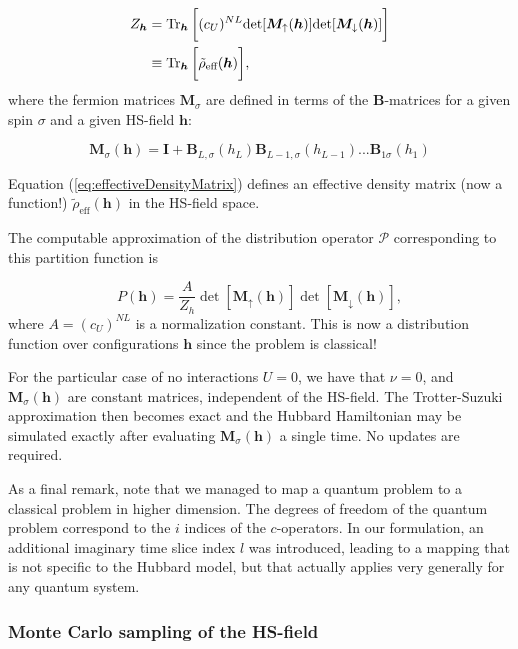 \begin{equation}\label{eq:effectiveDensityMatrix}
\begin{split}
Z_{\bm h} &=  \operatorname{Tr}_{\bm h} \bigg[ (c_U)^{NL} \text{det} [ \bm M_\uparrow (\bm h)] \text{det} [  \bm M_\downarrow (\bm h) ] \bigg] \\
&\equiv  \operatorname{Tr}_{\bm h} \bigg[  \tilde{\rho}_{\text{eff}} (\bm h) \bigg] ,
\end{split}
\end{equation}
where the fermion matrices $\bm M_\sigma$ are defined in terms of the $\bm B$-matrices for a given spin $\sigma$ and a given HS-field $\bm h$:

\begin{equation}
\bm M_\sigma (\bm h) = \bm I + \bm B_{L,\sigma} ( h_L) \bm B_{L-1,\sigma} ( h_{L-1}) ... \bm B_{1\sigma} ( h_1)
\end{equation}

Equation (\ref{eq:effectiveDensityMatrix}) defines an effective density matrix (now a function!) $\tilde{\rho}_{\text{eff}} (\bm h)$ in the HS-field space.

The computable approximation of the distribution operator $\mathcal{P}$ corresponding to this partition function is

\begin{equation}
P(\bm h) = \frac{A}{Z_h} \det [ \bm M_{\uparrow}(\bm h) ] \det [ \bm M_{\downarrow}(\bm h) ] ,
\end{equation}
where $A = (c_U)^{NL}$ is a normalization constant. This is now a distribution function over configurations $\bm h$ since the problem is classical!

For the particular case of no interactions $U = 0$, we have that $\nu = 0$, and $\bm M_\sigma (\bm h)$ are constant matrices, independent of the HS-field. The Trotter-Suzuki approximation then becomes exact and the Hubbard Hamiltonian may be simulated exactly after evaluating $\bm M_\sigma (\bm h)$ a single time. No updates are required.

As a final remark, note that we managed to map a quantum problem to a classical problem in higher dimension. The degrees of freedom of the quantum problem correspond to the $i$ indices  of the $c$-operators. In our formulation, an additional imaginary time slice index $l$ was introduced, leading to a mapping that is not specific to the Hubbard model, but that actually applies very generally for any quantum system.

\subsubsection{Monte Carlo sampling of the HS-field}

